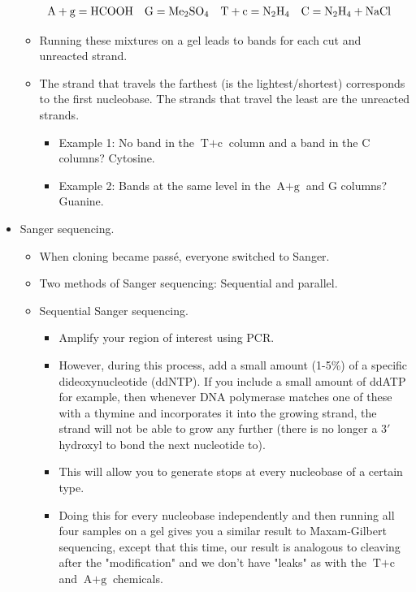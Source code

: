 \documentclass[../notes.tex]{subfiles}
\begin{document}
\begin{itemize}
\begin{itemize}
\begin{align*}
            \text{A}+\text{g} &= \ce{HCOOH}&
            \text{G} &= \ce{Me2SO4}&
            \text{T}+\text{c} &= \ce{N2H4}&
            \text{C} &= \ce{N2H4 + NaCl}
        \end{align*}
        \item Running these mixtures on a gel leads to bands for each cut and unreacted strand.
        \item The strand that travels the farthest (is the lightest/shortest) corresponds to the first nucleobase. The strands that travel the least are the unreacted strands.
        \begin{itemize}
            \item Example 1: No band in the $\text{T}+\text{c}$ column and a band in the $\text{C}$ columns? Cytosine.
            \item Example 2: Bands at the same level in the $\text{A}+\text{g}$ and $\text{G}$ columns? Guanine.
        \end{itemize}
    \end{itemize}
    \item Sanger sequencing.
    \begin{itemize}
        \item When cloning became pass\'{e}, everyone switched to Sanger.
        \item Two methods of Sanger sequencing: Sequential and parallel.
        \item Sequential Sanger sequencing.
        \begin{itemize}
            \item Amplify your region of interest using PCR.
            \item However, during this process, add a small amount (1-5\%) of a specific dideoxynucleotide (ddNTP). If you include a small amount of ddATP for example, then whenever DNA polymerase matches one of these with a thymine and incorporates it into the growing strand, the strand will not be able to grow any further (there is no longer a $3'$ hydroxyl to bond the next nucleotide to).
            \item This will allow you to generate stops at every nucleobase of a certain type.
            \item Doing this for every nucleobase independently and then running all four samples on a gel gives you a similar result to Maxam-Gilbert sequencing, except that this time, our result is analogous to cleaving after the "modification" and we don't have "leaks" as with the $\text{T}+\text{c}$ and $\text{A}+\text{g}$ chemicals.

\end{itemize}
\end{itemize}
\end{itemize}
\end{document}
